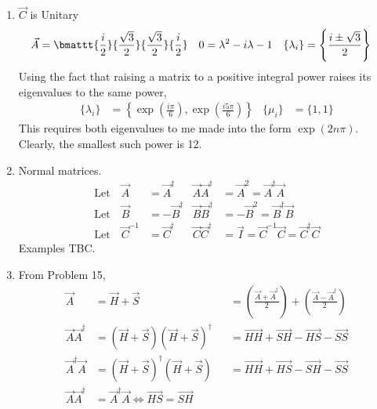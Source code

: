\begin{enumerate}
    \item $\vec{C}$ is Unitary
          \begin{align}
              \vec{A}       & = \bmattt{\frac{i}{2}}{\frac{\sqrt{3}}{2}}
              {\frac{\sqrt{3}}{2}}
              {\frac{i}{2}} &
              0             & = \lambda^2 - i\lambda - 1                 &
              \{\lambda_i\} & = \Bigg\{\frac{i \pm \sqrt{3}}{2}\Bigg\}
          \end{align}
          Using the fact that raising a matrix to a positive integral power raises its
          eigenvalues to the same power,
          \begin{align}
              \{\lambda_i\}    & = \left\{ \exp\left( \frac{i\pi}{6} \right),
              \exp\left( \frac{i 5\pi}{6}
              \right) \right\} &
              \{\mu_i\}        & = \{1, 1\}
          \end{align}
          This requires both eigenvalues to me made into the form $ \exp(2n \pi) $.
          Clearly, the smallest such power is 12.

    \item Normal matrices.
          \begin{align}
              \text{Let} \quad \vec{A}      & = \vec{A}^\dag                      &
              \vec{A}\vec{A}^\dag           & = \vec{A}^2 = \vec{A}^\dag \vec{A}    \\
              \text{Let} \quad \vec{B}      & = -\vec{B}^\dag                     &
              \vec{B}\vec{B}^\dag           & = -\vec{B}^2 = \vec{B}^\dag \vec{B}   \\
              \text{Let} \quad \vec{C}^{-1} & = \vec{C}^\dag                      &
              \vec{C}\vec{C}^\dag           & = \vec{I} = \vec{C}^{-1}\vec{C}
              = \vec{C}^\dag \vec{C}
          \end{align}
          Examples TBC.

    \item From Problem 15,
          \begin{align}
              \vec{A}              & = \vec{H} + \vec{S}                            &
                                   & =
              \left( \frac{\vec{A} + \vec{A}^\dag}{2} \right)
              + \left( \frac{\vec{A} - \vec{A}^\dag}{2} \right)                       \\
              \vec{A}\vec{A}^\dag  & = (\vec{H} + \vec{S})(\vec{H} + \vec{S})^\dag  &
                                   & = \vec{HH} + \vec{SH} - \vec{HS} - \vec{SS}      \\
              \vec{A}^\dag \vec{A} & = (\vec{H} + \vec{S})^\dag (\vec{H} + \vec{S}) &
                                   & = \vec{HH} + \vec{HS} - \vec{SH} - \vec{SS}      \\
              \vec{A}\vec{A}^\dag  & = \vec{A}^\dag \vec{A}
              \iff \vec{HS}  = \vec{SH}
          \end{align}


\end{enumerate}
